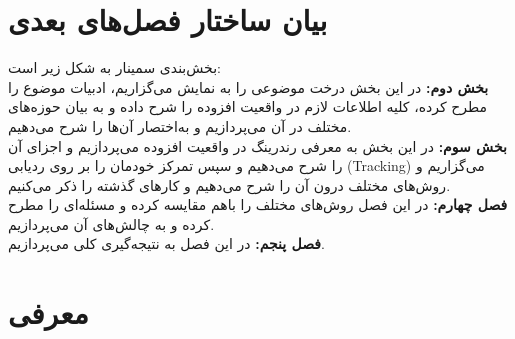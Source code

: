 \section{بیان ساختار فصل‌های بعدی}
بخش‌بندی سمینار به شکل زیر است:
\\
\textbf{
	بخش دوم:} در این بخش درخت موضوعی را به نمایش می‌گزاریم، ادبیات موضوع را مطرح کرده، کلیه اطلاعات لازم در واقعیت افزوده را شرح داده و به بیان حوزه‌های مختلف در آن می‌پردازیم و به‌اختصار آن‌ها را شرح می‌دهیم.
\\
\textbf{
	بخش سوم: } در این بخش به معرفی رندرینگ در واقعیت افزوده می‌پردازیم و اجزای آن را شرح می‌دهیم و سپس تمرکز خودمان را بر روی ردیابی (Tracking) می‌گزاریم و روش‌های مختلف درون آن را شرح می‌دهیم و کارهای گذشته را ذکر می‌کنیم.
\\
\textbf{
	فصل چهارم:} در این فصل روش‌های مختلف را باهم مقایسه کرده و مسئله‌ای را مطرح کرده و به چالش‌های آن می‌پردازیم.
\\
\textbf{
	فصل پنجم:} در این فصل به نتیجه‌گیری کلی می‌پردازیم.

\section{معرفی}
